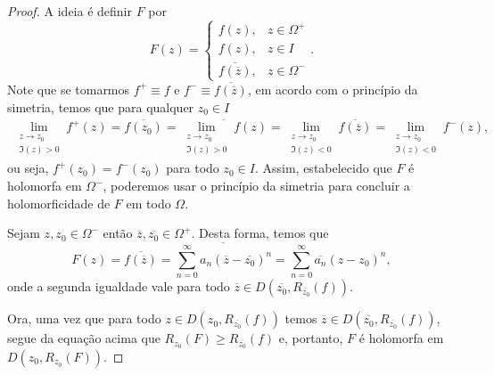     \begin{proof}
        A ideia é definir $F$ por
        \begin{equation*}
            F(z) =
            \begin{cases}
                f(z), & z \in \Omega^+ \\
                f(z), & z \in I \\
                \overline{f(\overline{z})}, & z\in\Omega^-   
            \end{cases}
            .
        \end{equation*}
        Note que se tomarmos $f^+ \equiv f$ e $f^- \equiv \overline{f(\overline{z})}$, 
        em acordo com o princípio da simetria, temos que para qualquer $z_0\in I$
        \begin{align*}
            \lim_{\substack{ z\to z_0 \\ \Im(z) > 0 }} f^+(z) 
            = 
            \overline{f(z_0)}
            =
            \overline{\lim_{\substack{ z\to z_0 \\ \Im(z) > 0 }} f(z)}
            =
            \lim_{\substack{ z\to z_0 \\ \Im(z) < 0 }} \overline{f(\overline{z})}
            =
            \lim_{\substack{ z\to z_0 \\ \Im(z) < 0 }} f^-(z),
        \end{align*}
        ou seja, $f^+(z_0) = f^-(z_0)$ para todo $z_0\in I$. Assim, estabelecido que 
        $F$ é holomorfa em $\Omega^-$, poderemos usar o princípio da simetria para 
        concluir a holomorficidade de $F$ em todo $\Omega$.
        
        Sejam $z, z_0\in\Omega^-$ então $\overline{z}, \overline{z_0}\in\Omega^+$. 
        Desta forma, temos que
        \begin{equation*}
            F(z) 
            = 
            \overline{f(\overline{z})} 
            =
            \overline{ \sum_{n=0}^{\infty}a_n(\overline{z} - \overline{z_0})^n }
            =
            \sum_{n=0}^{\infty}\overline{a_n}(z-z_0)^n,
        \end{equation*}
        onde a segunda igualdade vale para todo 
        $\overline{z}\in D(\overline{z_0}, R_{\overline{z_0}}(f))$.
        
        Ora, uma vez que para todo $z\in D(z_0, R_{\overline{z_0}}(f))$ temos
        $\overline{z}\in D(\overline{z_0}, R_{\overline{z_0}}(f))$, segue da equação acima
        que $R_{z_0}(F)\geq R_{\overline{z_0}}(f)$ e, portanto, $F$ é holomorfa em
        $D(z_0, R_{z_0}(F))$.
    \end{proof}
%


